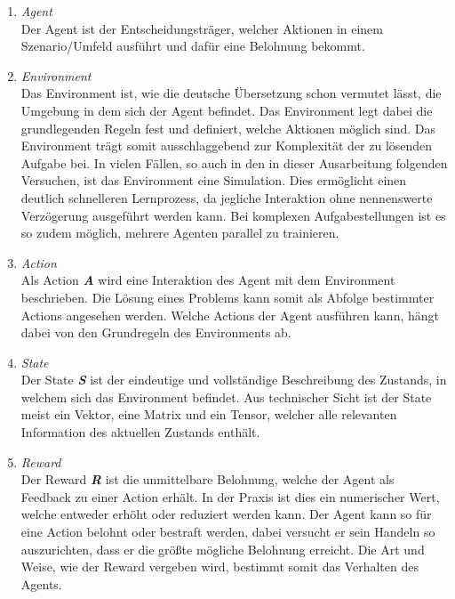 \begin{enumerate}
    \begin{enumerate}
        \item \textit{Agent}\\
        Der Agent \cite{mediumBeginnersGuide} ist der Entscheidungsträger, welcher Aktionen in einem Szenario/Umfeld ausführt und dafür eine Belohnung bekommt.
        \item \textit{Environment}\\
        Das Environment \cite{datasolutReinforcementLearning} ist, wie die deutsche Übersetzung schon vermutet lässt, die Umgebung in dem sich der Agent befindet. Das Environment legt dabei die grundlegenden Regeln fest und definiert, welche Aktionen möglich sind. Das Environment trägt somit ausschlaggebend zur Komplexität der zu lösenden Aufgabe bei. In vielen Fällen, so auch in den in dieser Ausarbeitung folgenden Versuchen, ist das Environment eine Simulation. Dies ermöglicht einen deutlich schnelleren Lernprozess, da jegliche Interaktion ohne nennenswerte Verzögerung ausgeführt werden kann. Bei komplexen Aufgabestellungen ist es so zudem möglich, mehrere Agenten parallel zu trainieren.
        \item \textit{Action}\\
        Als Action \textbf{\textit{A}} wird eine Interaktion des Agent mit dem Environment beschrieben. Die Lösung eines Problems kann somit als Abfolge bestimmter Actions angesehen werden. Welche Actions der Agent ausführen kann, hängt dabei von den Grundregeln des Environments ab.
        \item \textit{State}\\
        Der State \textbf{\textit{S}} ist der eindeutige und vollständige Beschreibung des Zustands, in welchem sich das Environment befindet. Aus technischer Sicht ist der State meist ein Vektor, eine Matrix und ein Tensor, welcher alle relevanten Information des aktuellen Zustands enthält.
        \item \textit{Reward}\\
        Der Reward \textbf{\textit{R}} \cite{datasolutReinforcementLearning} ist die unmittelbare Belohnung, welche der Agent als Feedback zu einer Action erhält. In der Praxis ist dies ein numerischer Wert, welche entweder erhöht oder reduziert werden kann. Der Agent kann so für eine Action belohnt oder bestraft werden, dabei versucht er sein Handeln so auszurichten, dass er die größte mögliche Belohnung erreicht. Die Art und Weise, wie der Reward vergeben wird, bestimmt somit das Verhalten des Agents.
    \end{enumerate}


\end{enumerate}
